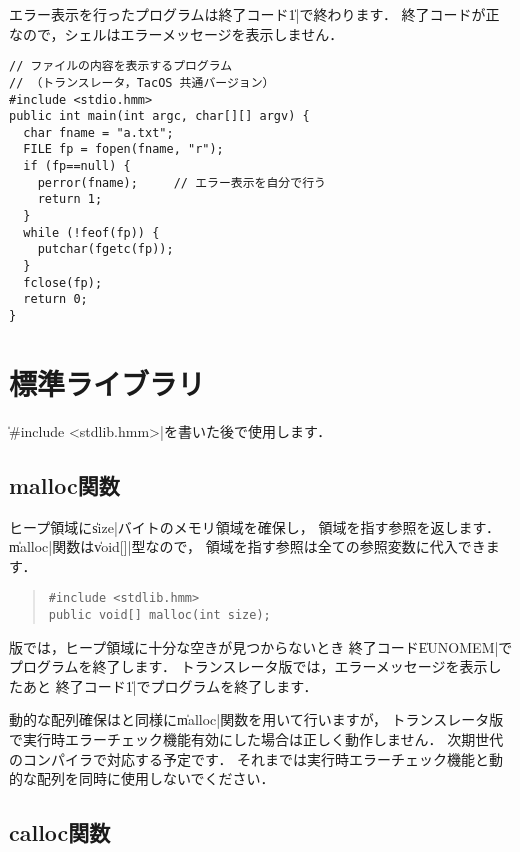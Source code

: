 エラー表示を行ったプログラムは終了コード\|1|で終わります．
終了コードが正なので，シェルはエラーメッセージを表示しません．

\begin{mylist}
\begin{verbatim}
// ファイルの内容を表示するプログラム
// （トランスレータ，TacOS 共通バージョン）
#include <stdio.hmm>
public int main(int argc, char[][] argv) {
  char fname = "a.txt";
  FILE fp = fopen(fname, "r");
  if (fp==null) {
    perror(fname);     // エラー表示を自分で行う
    return 1;
  }
  while (!feof(fp)) {
    putchar(fgetc(fp));
  }
  fclose(fp);
  return 0;
}
\end{verbatim}
\end{mylist}

\section{標準ライブラリ}

\|#include <stdlib.hmm>|を書いた後で使用します．

\subsection{malloc関数}

ヒープ領域に\|size|バイトのメモリ領域を確保し，
領域を指す参照を返します．
\|malloc|関数は\|void[]|型なので，
領域を指す参照は全ての参照変数に代入できます．

\begin{quote}
\begin{verbatim}
#include <stdlib.hmm>
public void[] malloc(int size);
\end{verbatim}
\end{quote}

{\tacos}版では，ヒープ領域に十分な空きが見つからないとき
終了コード\|EUNOMEM|でプログラムを終了します．
トランスレータ版では，エラーメッセージを表示したあと
終了コード\|1|でプログラムを終了します．

動的な配列確保は{\cl}と同様に\|malloc|関数を用いて行いますが，
トランスレータ版で実行時エラーチェック機能有効にした場合は正しく動作しません．
次期世代の{\cmm}コンパイラで対応する予定です．
それまでは実行時エラーチェック機能と動的な配列を同時に使用しないでください．

\subsection{calloc関数}

